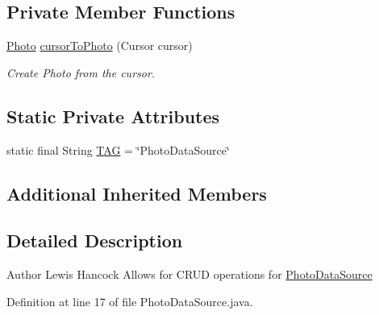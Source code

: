 \subsection*{Private Member Functions}
\begin{DoxyCompactItemize}
\item 
\hyperlink{classuk_1_1ac_1_1swan_1_1digitaltrails_1_1components_1_1_photo}{Photo} \hyperlink{classuk_1_1ac_1_1swan_1_1digitaltrails_1_1database_1_1_photo_data_source_ab9f61b8874c658e35f92e22f00a84f63}{cursor\+To\+Photo} (Cursor cursor)
\begin{DoxyCompactList}\small\item\em Create Photo from the cursor. \end{DoxyCompactList}\end{DoxyCompactItemize}
\subsection*{Static Private Attributes}
\begin{DoxyCompactItemize}
\item 
static final String \hyperlink{classuk_1_1ac_1_1swan_1_1digitaltrails_1_1database_1_1_photo_data_source_ad0d4fe3b44c8cca24b59b25aabca43d9}{T\+A\+G} = \char`\"{}Photo\+Data\+Source\char`\"{}
\end{DoxyCompactItemize}
\subsection*{Additional Inherited Members}


\subsection{Detailed Description}
\begin{DoxyAuthor}{Author}
Lewis Hancock Allows for C\+R\+U\+D operations for \hyperlink{classuk_1_1ac_1_1swan_1_1digitaltrails_1_1database_1_1_photo_data_source}{Photo\+Data\+Source} 
\end{DoxyAuthor}


Definition at line 17 of file Photo\+Data\+Source.\+java.



